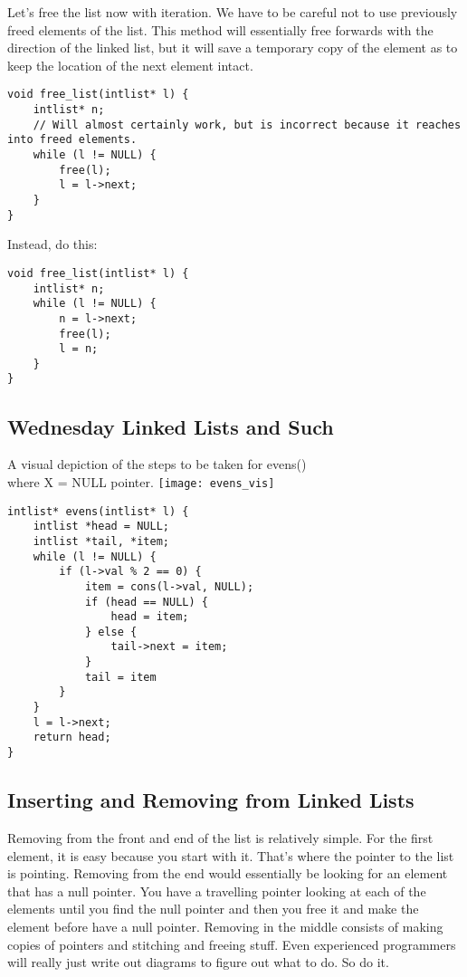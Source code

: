 \documentclass[12pt]{article}
\theoremstyle{definition}
\begin{document}
Let's free the list now with iteration. We have to be careful not to use previously freed elements of the list. This method will essentially free forwards with the direction of the linked list, but it will save a temporary copy of the element as to keep the location of the next element intact.

\begin{lstlisting}
void free_list(intlist* l) {
    intlist* n;
    // Will almost certainly work, but is incorrect because it reaches into freed elements. 
    while (l != NULL) {
        free(l);
        l = l->next;
    }
}
\end{lstlisting}
Instead, do this:
\begin{lstlisting}
void free_list(intlist* l) {
    intlist* n;
    while (l != NULL) {
        n = l->next;
        free(l);
        l = n;
    }
}
\end{lstlisting}
\newpage
\subsection{Wednesday Linked Lists and Such}
\begin{center}
    A visual depiction of the steps to be taken for evens()
    \\where X = NULL pointer.
    \texttt{[image: evens\_vis]}
\end{center}
    
\begin{lstlisting}
intlist* evens(intlist* l) {
    intlist *head = NULL; 
    intlist *tail, *item; 
    while (l != NULL) {
        if (l->val % 2 == 0) {
            item = cons(l->val, NULL);
            if (head == NULL) {
                head = item;
            } else {
                tail->next = item;
            }
            tail = item
        }
    }
    l = l->next;
    return head;
}
\end{lstlisting}

\subsection{Inserting and Removing from Linked Lists}
Removing from the front and end of the list is relatively simple. For the first element, it is easy because you start with it. That's where the pointer to the list is pointing. Removing from the end would essentially be looking for an element that has a null pointer. You have a travelling pointer looking at each of the elements until you find the null pointer and then you free it and make the element before have a null pointer. Removing in the middle consists of making copies of pointers and stitching and freeing stuff. 
\note Even experienced programmers will really just write out diagrams to figure out what to do. So do it.
\end{document}
